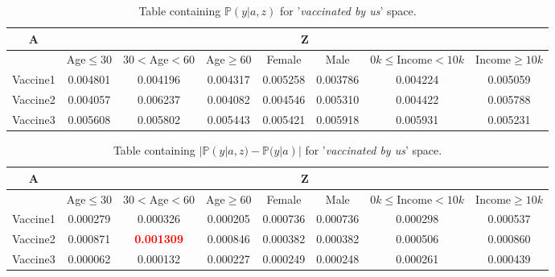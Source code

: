 \documentclass{article}
\begin{document}
\begin{center}
    \begin{table}[H]
    \begin{adjustbox}{max width=\textwidth}
        \begin{tabular}{ |c| c c c c c c c|}
            \hline
              A  & \multicolumn{7}{c|}{Z} \\
              \hline
              & Age$\leq30$ &    $30<$Age$<60$ &     Age$\geq60$ &    Female &      Male &   $0k\leq$Income$<10k$ &    Income$\geq10k$ \\
            \hline
            Vaccine1 &  0.004801 &  0.004196 &  0.004317 &  0.005258 &  0.003786 &  0.004224 &  0.005059 \\
            Vaccine2 &  0.004057 &  0.006237 &  0.004082 &  0.004546 &  0.005310 &  0.004422 &  0.005788 \\
            Vaccine3 &  0.005608 &  0.005802 &  0.005443 &  0.005421 &  0.005918 &  0.005931 &  0.005231 
             \\ \hline
        \end{tabular}
        \end{adjustbox}
        \caption{Table containing $\mathbb{P}(y | a, z)$ for '\textit{vaccinated by us}' space.}
        \label{tab:8}
    \end{table}
\end{center}


\begin{center}
\begin{table}[H]
\begin{adjustbox}{max width=\textwidth}
    \begin{tabular}{ |c| c c c c c c c|}
        \hline
          A  & \multicolumn{7}{c|}{Z} \\
          \hline
          & Age$\leq30$ &    $30<$Age$<60$ &     Age$\geq60$ &    Female &      Male &   $0k\leq$Income$<10k$ &    Income$\geq10k$  \\
        \hline
        Vaccine1 &  0.000279 &  0.000326 &  0.000205 &  0.000736 &  0.000736 &  0.000298 &  0.000537 \\
        Vaccine2 &  0.000871 &  \textbf{\textcolor{red}{0.001309}} &  0.000846 &  0.000382 &  0.000382 &  0.000506 &  0.000860 \\
        Vaccine3 &  0.000062 &  0.000132 &  0.000227 &  0.000249 &  0.000248 &  0.000261 &  0.000439
         \\ \hline
    \end{tabular}
    \end{adjustbox}
    \caption{Table containing $| \mathbb{P}(y | a, z) - \mathbb{P}(y | a) |$ for '\textit{vaccinated by us}' space.}
    \label{tab:diff1}
\end{table}
\end{center}
\end{document}
